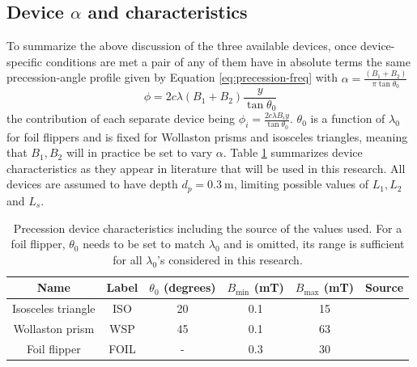 \subsection{Device $\alpha$ and characteristics}
\label{c3.3.4}
To summarize the above discussion of the three available devices, once device-specific conditions are met a pair of any of them have in absolute terms the same precession-angle profile given by Equation \eqref{eq:precession-freq} with $\alpha = \frac{(B_1 + B_2)}{\pi\tan\theta_0}$
\begin{equation}
	\phi = 2c\lambda (B_1 + B_2)\frac{y}{\tan\theta_0} \label{eq:device-prec}
\end{equation}
the contribution of each separate device being $\phi_i = \frac{2c\lambda B_i y}{\tan\theta_0}$. $\theta_0$ is a function of $\lambda_0$ for foil flippers and is fixed for Wollaston prisms and isosceles triangles, meaning that $B_1, B_2$ will in practice be set to vary $\alpha$. Table \ref{tab:device-properties} summarizes device characteristics as they appear in literature that will be used in this research. All devices are assumed to have depth $d_p = \SI{0.3}{\meter}$, limiting possible values of $L_1, L_2$ and $L_s$. 
\begin{table}[h!]
	\centering
	\begin{tabular}{c|c c c c c}
		\toprule
		Name & Label & $\theta_0$ (degrees) & $B_{\text{min}}$ (mT) & $B_{\text{max}}$ (mT) & Source \\
		\midrule
		Isosceles triangle & ISO & 20 & 0.1 & 15 & \cite{kusmin2017} \\
		Wollaston prism & WSP & 45 & 0.1 & 63 & \cite{li2021} \\
		Foil flipper & FOIL & - & 0.3 & 30 & \cite{bouwman2011} \\
		\bottomrule
	\end{tabular}
	\caption{Precession device characteristics including the source of the values used. For a foil flipper, $\theta_0$ needs to be set to match $\lambda_0$ and is omitted, its range is sufficient for all $\lambda_0$'s considered in this research.}
	\label{tab:device-properties}
\end{table}
